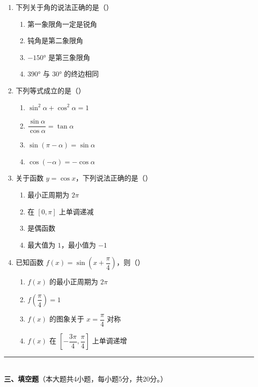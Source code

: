 \documentclass[12pt, a4paper]{ctexart}
\begin{document}
\begin{enumerate}[resume]
\item 下列关于角的说法正确的是（\quad）
  \begin{enumerate}[label=\Alph*., itemsep=0pt]
    \item 第一象限角一定是锐角
    \item 钝角是第二象限角
    \item $-150°$ 是第三象限角
    \item $390°$ 与 $30°$ 的终边相同
  \end{enumerate}

\item 下列等式成立的是（\quad）
  \begin{enumerate}[label=\Alph*., itemsep=0pt]
    \item $\sin^2\alpha+\cos^2\alpha=1$
    \item $\dfrac{\sin\alpha}{\cos\alpha}=\tan\alpha$
    \item $\sin(\pi-\alpha)=\sin\alpha$
    \item $\cos(-\alpha)=-\cos\alpha$
  \end{enumerate}

\item 关于函数 $y=\cos x$，下列说法正确的是（\quad）
  \begin{enumerate}[label=\Alph*., itemsep=0pt]
    \item 最小正周期为 $2\pi$
    \item 在 $[0,\pi]$ 上单调递减
    \item 是偶函数
    \item 最大值为 $1$，最小值为 $-1$
  \end{enumerate}

\item 已知函数 $f(x)=\sin\!\left(x+\dfrac{\pi}{4}\right)$，则（\quad）
  \begin{enumerate}[label=\Alph*., itemsep=0pt]
    \item $f(x)$ 的最小正周期为 $2\pi$
    \item $f\!\left(\dfrac{\pi}{4}\right)=1$
    \item $f(x)$ 的图象关于 $x=\dfrac{\pi}{4}$ 对称
    \item $f(x)$ 在 $\left[-\dfrac{3\pi}{4},\dfrac{\pi}{4}\right]$ 上单调递增
  \end{enumerate}
\end{enumerate}

\vspace{6pt}

\noindent\rule{\textwidth}{0.4pt}\\[2pt]
{\large\bfseries 三、填空题}（本大题共4小题，每小题5分，共20分。）
\end{document}
